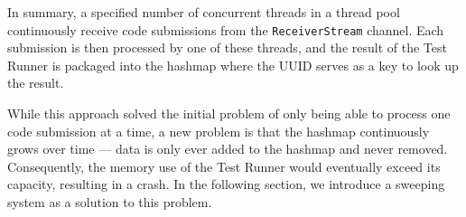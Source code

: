 In summary, a specified number of concurrent threads in a thread pool continuously receive code submissions from the \texttt{ReceiverStream} channel.
Each submission is then processed by one of these threads, and the result of the Test Runner is packaged into the hashmap where the UUID serves as a key to look up the result.

While this approach solved the initial problem of only being able to process one code submission at a time, a new problem is that the hashmap continuously grows over time --- data is only ever added to the hashmap and never removed.
Consequently, the memory use of the Test Runner would eventually exceed its capacity, resulting in a crash.
In the following section, we introduce a sweeping system as a solution to this problem.